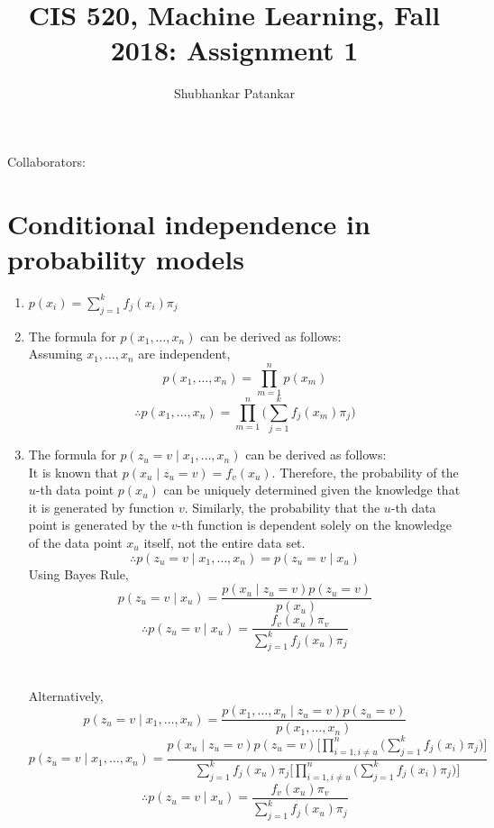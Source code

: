 \documentclass[english]{article}
\title{CIS 520, Machine Learning, Fall 2018: Assignment 1}
\author{Shubhankar Patankar}
\begin{document}
\maketitle

{\normalsize \noindent Collaborators:  \underline{}}


\section{Conditional independence in probability models}

\begin{enumerate} 
\item $p(x_i) = \sum_{j = 1}^{k} f_j(x_i) \pi_{j}$ 

\item The formula for $p(x_1, \dots, x_n)$ can be derived as follows:
\\Assuming $x_1, \dots, x_n$ are independent,
$$p(x_1, \dots, x_n) =\prod_{m = 1}^{n} p(x_m)$$ 
$$\therefore p(x_1, \dots, x_n) = \prod_{m = 1}^{n} \bigg(\sum_{j = 1}^{k} f_j(x_m) \pi_{j}\bigg)$$

\item The formula for $p(z_u = v \mid x_1, \dots, x_n)$ can be derived as follows:  
\\ It is known that $p(x_u  \mid z_u = v) = f_v(x_u)$. Therefore, the probability of the $u$-th data point $p(x_u)$ can be uniquely determined given the knowledge that it is generated by function $v$. Similarly, the probability that the $u$-th data point is generated by the $v$-th function is dependent solely on the knowledge of the data point $x_u$ itself, not the entire data set. 
$$\therefore p(z_u = v \mid x_1, \dots, x_n) = p(z_u = v \mid x_u)$$
Using Bayes Rule, 
$$p(z_u = v \mid x_u) = \frac{p(x_u \mid z_u = v) p(z_u = v)}{p(x_u)}$$
$$\therefore p(z_u = v \mid x_u) = \frac{f_v(x_u) \pi_{v}}{\sum_{j = 1}^{k} f_j(x_u) \pi_{j}}$$ \\ \\
Alternatively,
$$p(z_u = v \mid x_1, \dots, x_n) = \frac{p(x_1, \dots, x_n \mid z_u = v) p(z_u = v)}{p(x_1, \dots, x_n)}$$
$$p(z_u = v \mid x_1, \dots, x_n) =  \frac{p(x_u \mid z_u = v) p(z_u = v) \bigg[\prod_{i = 1, i \neq u }^{n} \bigg(\sum_{j = 1}^{k} f_j(x_i) \pi_{j}\bigg)\bigg]}  {\sum_{j = 1}^{k} f_j(x_u) \pi_{j}  \bigg[\prod_{i = 1, i \neq u }^{n} \bigg(\sum_{j = 1}^{k} f_j(x_i) \pi_{j}\bigg)\bigg]}$$
$$\therefore p(z_u = v \mid x_u) = \frac{f_v(x_u) \pi_{v}}{\sum_{j = 1}^{k} f_j(x_u) \pi_{j}}$$ 
\end{enumerate}
\end{document}
